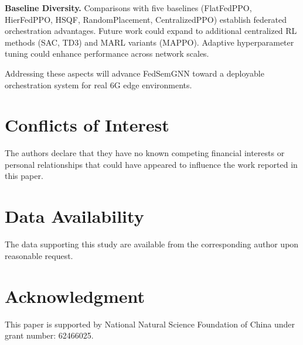 \documentclass[conference]{IEEEtran}
\begin{document}
	\textbf{Baseline Diversity.} Comparisons with five baselines (FlatFedPPO, HierFedPPO, HSQF, RandomPlacement, CentralizedPPO) establish federated orchestration advantages. Future work could expand to additional centralized RL methods (SAC, TD3) and MARL variants (MAPPO). Adaptive hyperparameter tuning could enhance performance across network scales.
	
	Addressing these aspects will advance FedSemGNN toward a deployable orchestration system for real 6G edge environments.
	
	
	
	\section*{Conflicts of Interest}
	The authors declare that they have no known competing financial interests or personal relationships that could have appeared to influence the work reported in this paper.
	
	\section*{Data Availability}
	The data supporting this study are available from the corresponding author upon reasonable request.
	
	\section*{Acknowledgment}
	This paper is supported by National Natural Science Foundation of China under grant number: 62466025.
	
	
	
	
	
\end{document}
